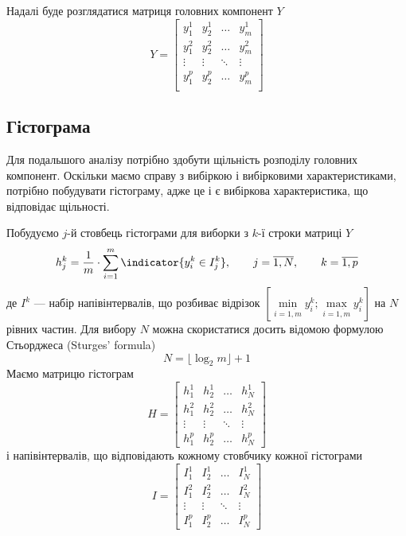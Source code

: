Надалі буде розглядатися матриця головних компонент $Y$
\begin{equation*}
  Y = \begin{bmatrix}
    y_1^1  & y_2^1  & \dots  & y_m^1  \\
    y_1^2  & y_2^2  & \dots  & y_m^2  \\
    \vdots & \vdots & \ddots & \vdots \\
    y_1^p  & y_2^p  & \dots  & y_m^p  \\
    \end{bmatrix}
\end{equation*}
\subsection{Гістограма}

Для подальшого аналізу потрібно здобути щільність розподілу головних компонент.
Оскільки маємо справу з вибіркою і вибірковими характеристиками,
потрібно побудувати гістограму, адже це і є вибіркова характеристика,
що відповідає щільності.

Побудуємо $j$-й стовбець гістограми для виборки з $k$-ї строки матриці $Y$
\begin{equation*}
  h_j^k = \frac{1}{m} \cdot \sum_{i=1}^{m} \indicator{y_i^k \in I_j^k},
  \qquad j = \overline{1, N},
  \qquad k = \overline{1, p}
\end{equation*}
де $I^k$ --- набір напівінтервалів, що розбиває відрізок
$\left[ \min\limits_{i=\overline{1,m}}{y_i^k};
\max\limits_{i=\overline{1,m}}{y_i^k} \right]$ на $N$ рівних частин.
Для вибору $N$ можна скористатися досить відомою формулою Стьорджеса
(Sturges' formula) \cite{Sturges:1926:CCI}
\begin{equation*}
  N = \lfloor \log_2 m \rfloor + 1
\end{equation*}
Маємо матрицю гістограм
\begin{equation*}
  H = \begin{bmatrix}
    h_1^1  & h_2^1  & \dots  & h_N^1  \\
    h_1^2  & h_2^2  & \dots  & h_N^2  \\
    \vdots & \vdots & \ddots & \vdots \\
    h_1^p  & h_2^p  & \dots  & h_N^p
  \end{bmatrix}
\end{equation*}
і напівінтервалів, що відповідають кожному стовбчику кожної гістограми
\begin{equation*}
  I = \begin{bmatrix}
    I_1^1  & I_2^1  & \dots  & I_N^1  \\
    I_1^2  & I_2^2  & \dots  & I_N^2  \\
    \vdots & \vdots & \ddots & \vdots \\
    I_1^p  & I_2^p  & \dots  & I_N^p
  \end{bmatrix}
\end{equation*}


